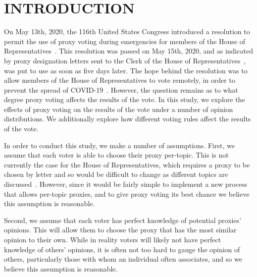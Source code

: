 %
%

\chapter{INTRODUCTION}\label{ch:introduction}
\thispagestyle{empty}

On May 13th, 2020, the 116th United States Congress introduced a resolution
to permit the use of proxy voting during emergencies for members of the House of
Representatives~\cite{Congress.gov2020}.
This resolution was passed on May 15th, 2020, and as indicated by proxy designation
letters sent to the Clerk of the House of Representatives~\cite{Clerk.House.gov2020},
was put to use as soon as five days later.
The hope behind the resolution was to allow members of the House of Representatives
to vote remotely, in order to prevent the spread of COVID-19~\cite{Congress.gov2020}.
However, the question remains as to what degree proxy voting affects the results of
the vote.
In this study, we explore the effects of proxy voting on the results of the vote
under a number of opinion distributions.
We additionally explore how different voting rules affect the results of the vote.


In order to conduct this study, we make a number of assumptions.
First, we assume that each voter is able to choose their proxy per-topic.
This is not currently the case for the House of Representatives, which requires
a proxy to be chosen by letter and so would be difficult to change as different
topics are discussed~\cite{Congress.gov2020}.
However, since it would be fairly simple to implement a new process that allows
per-topic proxies, and to give proxy voting its best chance we believe this assumption
is reasonable.

Second, we assume that each voter has perfect knowledge of potential proxies' opinions.
This will allow them to choose the proxy that has the most similar opinion to their own.
While in reality voters will likely not have perfect knowledge of others' opinions,
it is often not too hard to gauge the opinion of others, particularly those with whom
an individual often associates, and so we believe this assumption is reasonable.

